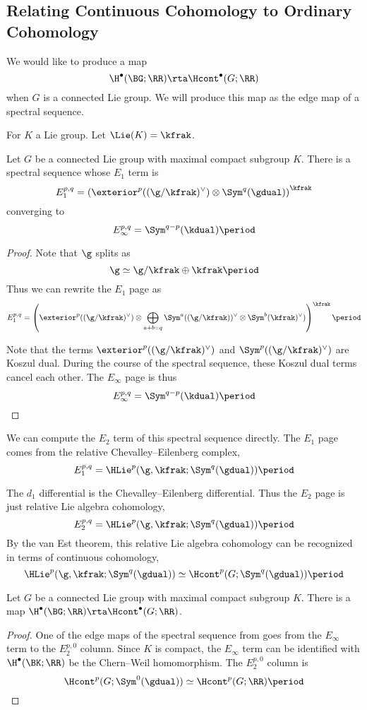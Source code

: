 \subsection{Relating Continuous Cohomology to Ordinary Cohomology}

We would like to produce a map
\[ 
	\H^\bullet(\BG;\RR)\rta \Hcont^\bullet(G;\RR)
\]
when $G$ is a connected Lie group. We will produce this map as the edge map of a spectral sequence.

For $K$ a Lie group. Let $\Lie(K)=\kfrak$.

\begin{lem}\label{ss}
	Let $G$ be a connected Lie group with maximal compact subgroup $K$. 
	There is a spectral sequence whose $E_1$ term is 
	\[
		E_1^{p,q}=\left(\exterior^p((\g/\kfrak)^\vee)\otimes \Sym^q(\gdual)\right)^\kfrak
	\]
	converging to 
	\[
		E_\infty^{p,q}=\Sym^{q-p}(\kdual)\period
	\]
\end{lem}

\begin{proof}
	Note that $\g$ splits as
	\[
		\g\simeq \g/\kfrak\oplus\kfrak\period
	\]
	Thus we can rewrite the $E_1$ page as
	\[
		E_1^{p,q}=\left(\exterior^p((\g/\kfrak)^\vee)\otimes \bigoplus_{a+b=q}\Sym^a((\g/\kfrak))^\vee\otimes \Sym^b(\kfrak)^\vee)\right)^\kfrak\period
	\]

	Note that the terms $\exterior^p((\g/\kfrak)^\vee)$ and $\Sym^p((\g/\kfrak)^\vee)$ are Koszul dual. 
	During the course of the spectral sequence, these Koszul dual terms cancel each other. 
	The $E_\infty$ page is thus
	\[
		E_\infty^{p,q}=\Sym^{q-p}(\kdual)\period \qedhere
	\]
\end{proof}

We can compute the $E_2$ term of this spectral sequence directly. The $E_1$ page comes from the relative Chevalley--Eilenberg complex,
\[E_1^{p,q}=\HLie^p(\g,\kfrak;\Sym^q(\gdual))\period
\]

The $d_1$ differential is the Chevalley--Eilenberg differential. Thus the $E_2$ page is just relative Lie algebra cohomology,
\[E_2^{p,q}=\HLie^p(\g,\kfrak;\Sym^q(\gdual)) \period\]
By the van Est theorem, this relative Lie algebra cohomology can be recognized in terms of continuous cohomology,
\[
	\HLie^p(\g,\kfrak;\Sym^q(\gdual))\simeq \Hcont^p(G;\Sym^q(\gdual)) \period
\]

\begin{cor}
	Let $G$ be a connected Lie group with maximal compact subgroup $K$.
	There is a map $\H^\bullet(\BG;\RR)\rta \Hcont^\bullet(G;\RR)$.
\end{cor}

\begin{proof}
	One of the edge maps of the spectral sequence from  goes from the $E_\infty$ term to the $E_2^{p,0}$ column. 
	Since $K$ is compact, the $E_\infty$ term can be identified with $\H^\bullet(\BK;\RR)$ be the Chern--Weil homomorphism. The $E_2^{p,0}$ column is  
	\[
		\Hcont^p(G;\Sym^0(\gdual))\simeq \Hcont^p(G;\RR) \period \qedhere
	\]
\end{proof}
